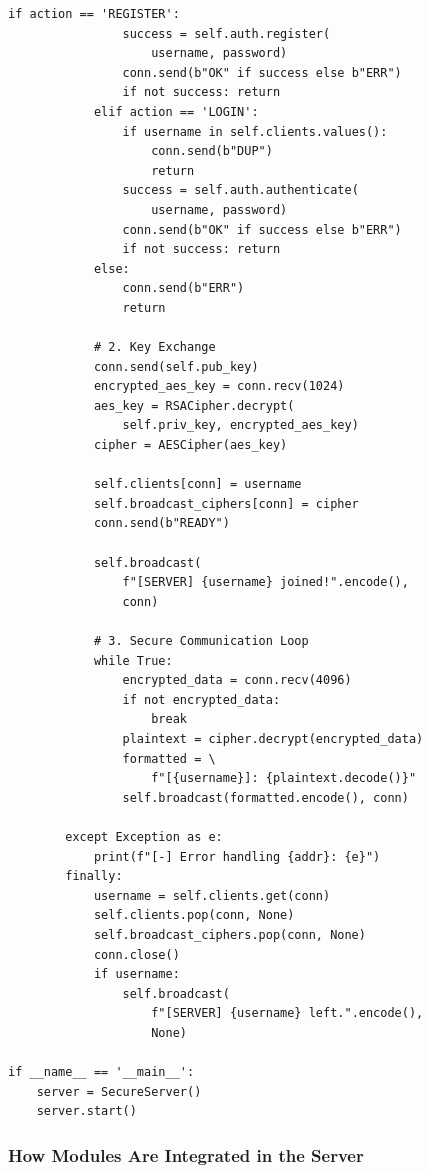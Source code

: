 \documentclass[12pt,a4paper]{article}
\begin{document}
\begin{lstlisting}[caption={Secure Server – \texttt{server.py}}]
            if action == 'REGISTER':
                success = self.auth.register(
                    username, password)
                conn.send(b"OK" if success else b"ERR")
                if not success: return
            elif action == 'LOGIN':
                if username in self.clients.values():
                    conn.send(b"DUP")
                    return
                success = self.auth.authenticate(
                    username, password)
                conn.send(b"OK" if success else b"ERR")
                if not success: return
            else:
                conn.send(b"ERR")
                return

            # 2. Key Exchange
            conn.send(self.pub_key)
            encrypted_aes_key = conn.recv(1024)
            aes_key = RSACipher.decrypt(
                self.priv_key, encrypted_aes_key)
            cipher = AESCipher(aes_key)

            self.clients[conn] = username
            self.broadcast_ciphers[conn] = cipher
            conn.send(b"READY")

            self.broadcast(
                f"[SERVER] {username} joined!".encode(),
                conn)

            # 3. Secure Communication Loop
            while True:
                encrypted_data = conn.recv(4096)
                if not encrypted_data:
                    break
                plaintext = cipher.decrypt(encrypted_data)
                formatted = \
                    f"[{username}]: {plaintext.decode()}"
                self.broadcast(formatted.encode(), conn)

        except Exception as e:
            print(f"[-] Error handling {addr}: {e}")
        finally:
            username = self.clients.get(conn)
            self.clients.pop(conn, None)
            self.broadcast_ciphers.pop(conn, None)
            conn.close()
            if username:
                self.broadcast(
                    f"[SERVER] {username} left.".encode(),
                    None)

if __name__ == '__main__':
    server = SecureServer()
    server.start()
\end{lstlisting}

\subsubsection{How Modules Are Integrated in the Server}
\end{document}
